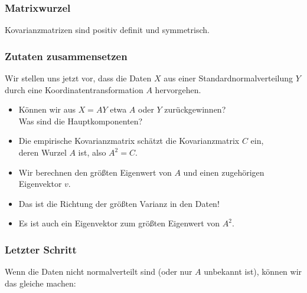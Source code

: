 \begin{frame}
\frametitle{Matrixwurzel}
Kovarianzmatrizen sind positiv definit und symmetrisch.

\end{frame}


\begin{frame}
\frametitle{Zutaten zusammensetzen}
Wir stellen uns jetzt vor, dass die Daten $X$ aus einer Standardnormalverteilung $Y$ durch eine Koordinatentransformation $A$ hervorgehen.

\begin{itemize}[<+->]
  \item Können wir aus $X = AY$ etwa $A$ oder $Y$ zurückgewinnen? \\ Was sind die Hauptkomponenten?
  \item  Die empirische Kovarianzmatrix schätzt die Kovarianzmatrix $C$ ein,\\
  deren Wurzel $A$ ist, also $A^2 = C$.
\item Wir berechnen den größten Eigenwert von $A$ und einen zugehörigen Eigenvektor $v$.
\item Das ist die Richtung der größten Varianz in den Daten! 
\item Es ist auch ein Eigenvektor zum größten Eigenwert von $A^2$.
\end{itemize}
\end{frame}


\begin{frame}
\frametitle{Letzter Schritt}
Wenn die Daten nicht normalverteilt sind (oder nur $A$ unbekannt ist),
können wir das gleiche machen:


\end{frame}


